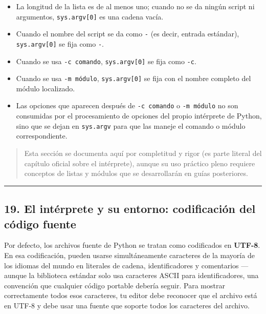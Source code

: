 \documentclass[
  doc,
  floatsintext,
  longtable,
  a4paper,
  nolmodern,
  notxfonts,
  notimes,
  12pt,
  colorlinks=true,linkcolor=blue,citecolor=blue,urlcolor=blue]{apa7}
\providecommand{\tightlist}{%
  \setlength{\itemsep}{0pt}\setlength{\parskip}{0pt}}
\begin{document}
\begin{itemize}
\tightlist
\item
  La longitud de la lista es de al menos uno; cuando no se da ningún
  script ni argumentos, \texttt{sys.argv{[}0{]}} es una cadena vacía.
\item
  Cuando el nombre del script se da como
  \texttt{\textquotesingle{}-\textquotesingle{}} (es decir, entrada
  estándar), \texttt{sys.argv{[}0{]}} se fija como
  \texttt{\textquotesingle{}-\textquotesingle{}}.
\item
  Cuando se usa \texttt{-c\ comando}, \texttt{sys.argv{[}0{]}} se fija
  como \texttt{\textquotesingle{}-c\textquotesingle{}}.
\item
  Cuando se usa \texttt{-m\ módulo}, \texttt{sys.argv{[}0{]}} se fija
  con el nombre completo del módulo localizado.
\item
  Las opciones que aparecen después de \texttt{-c\ comando} o
  \texttt{-m\ módulo} no son consumidas por el procesamiento de opciones
  del propio intérprete de Python, sino que se dejan en
  \texttt{sys.argv} para que las maneje el comando o módulo
  correspondiente.
\end{itemize}

\begin{quote}
Esta sección se documenta aquí por completitud y rigor (es parte literal
del capítulo oficial sobre el intérprete), aunque su uso práctico pleno
requiere conceptos de listas y módulos que se desarrollarán en guías
posteriores.
\end{quote}

\begin{center}\rule{0.5\linewidth}{0.5pt}\end{center}

\subsection{19. El intérprete y su entorno: codificación del código
fuente}\label{el-intuxe9rprete-y-su-entorno-codificaciuxf3n-del-cuxf3digo-fuente}

Por defecto, los archivos fuente de Python se tratan como codificados en
\textbf{UTF-8}. En esa codificación, pueden usarse simultáneamente
caracteres de la mayoría de los idiomas del mundo en literales de
cadena, identificadores y comentarios --- aunque la biblioteca estándar
solo usa caracteres ASCII para identificadores, una convención que
cualquier código portable debería seguir. Para mostrar correctamente
todos esos caracteres, tu editor debe reconocer que el archivo está en
UTF-8 y debe usar una fuente que soporte todos los caracteres del
archivo.
\end{document}

